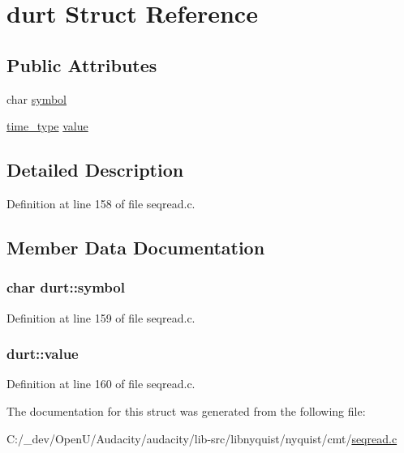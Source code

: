 \hypertarget{structdurt}{}\section{durt Struct Reference}
\label{structdurt}
\subsection*{Public Attributes}
\begin{DoxyCompactItemize}
\item 
char \hyperlink{structdurt_a2d94268244d916900c88bcc7b598be4e}{symbol}
\item 
\hyperlink{midifns_8h_a3f787491db5dbc75c21b27d54e9ebae6}{time\+\_\+type} \hyperlink{structdurt_abf8cef4c595d006f02d563f9c73fa609}{value}
\end{DoxyCompactItemize}


\subsection{Detailed Description}


Definition at line 158 of file seqread.\+c.



\subsection{Member Data Documentation}
\subsubsection[{\texorpdfstring{symbol}{symbol}}]{\setlength{\rightskip}{0pt plus 5cm}char durt\+::symbol}\hypertarget{structdurt_a2d94268244d916900c88bcc7b598be4e}{}\label{structdurt_a2d94268244d916900c88bcc7b598be4e}


Definition at line 159 of file seqread.\+c.

\subsubsection[{\texorpdfstring{value}{value}}]{ durt\+::value}\hypertarget{structdurt_abf8cef4c595d006f02d563f9c73fa609}{}\label{structdurt_abf8cef4c595d006f02d563f9c73fa609}


Definition at line 160 of file seqread.\+c.



The documentation for this struct was generated from the following file\+:\begin{DoxyCompactItemize}
\item 
C\+:/\+\_\+dev/\+Open\+U/\+Audacity/audacity/lib-\/src/libnyquist/nyquist/cmt/\hyperlink{seqread_8c}{seqread.\+c}\end{DoxyCompactItemize}
